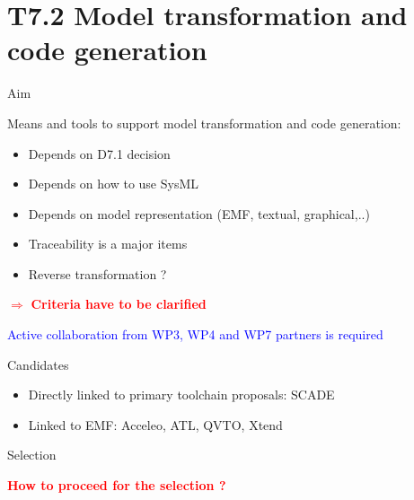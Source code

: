 
\section{T7.2 Model transformation and code generation}

\begin{frame}{Aim}

   Means and tools to support model transformation and code generation:
 
   \begin{itemize}
   \item Depends on D7.1 decision
   \item Depends on how to use SysML
   \item Depends on model representation (EMF, textual, graphical,..)
   \item Traceability is a major items
   \item Reverse transformation ?
   \end{itemize} 

\pause   
   
  
  \textcolor{red}{$ \Rightarrow $ \bf{Criteria have to be clarified} } 

\pause   
   
   \textcolor{blue}{Active collaboration from WP3, WP4 and WP7  partners is required}
   
\end{frame}



\begin{frame}{Candidates}

  
   \begin{itemize}
   \item Directly linked to primary toolchain proposals: SCADE
   \item Linked to EMF: Acceleo, ATL, QVTO, Xtend
   \end{itemize}
   
   
\end{frame}



\begin{frame}{Selection}

   \textbf{\textcolor{red}{How to proceed for the selection ?}}
 
 
   
   
\end{frame}

